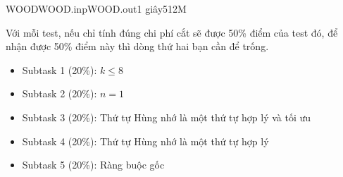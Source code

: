 \begin{problem}{WOOD}{WOOD.inp}{WOOD.out}{1 giây}{512M}
{\Examples
\begin{example}%
%
\end{example}
\Scoring
Với mỗi test, nếu chỉ tính đúng chi phí cắt sẽ được 50\% điểm của test đó, để nhận được 50\% điểm này thì dòng thứ hai bạn cần để trống.
\begin{itemize}
	\item Subtask 1 (20\%): $k \leq 8$
	\item Subtask 2 (20\%): $n = 1$
	\item Subtask 3 (20\%): Thứ tự Hùng nhớ là một thứ tự hợp lý và tối ưu
	\item Subtask 4 (20\%): Thứ tự Hùng nhớ là một thứ tự hợp lý
	\item Subtask 5 (20\%): Ràng buộc gốc
\end{itemize}

\begin{comment}
\Hint

\end{comment}
}
\end{problem}
